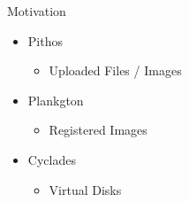 \documentclass[utf8]{beamer}
\begin{document}
\begin{frame}{Motivation}

  \begin{itemize}
  \item Pithos
    \begin{itemize}
      \item Uploaded Files / Images
    \end{itemize}
  \item Plankgton
    \begin{itemize}
      \item Registered Images
    \end{itemize}
  \item Cyclades
    \begin{itemize}
      \item Virtual Disks
    \end{itemize}      
  \end{itemize}

\end{frame}
\end{document}
